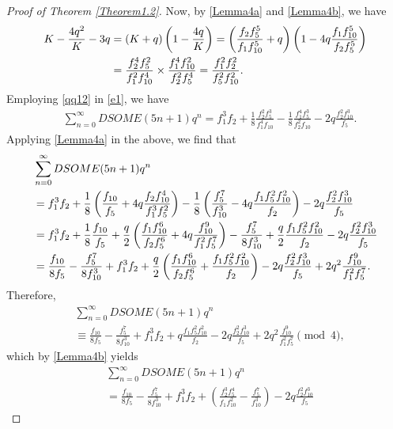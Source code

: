 \documentclass[12pt]{amsart}
\theoremstyle{definition}
\numberwithin{equation}{section}
\begin{document}
\begin{proof}[Proof of Theorem \ref{Theorem1.2}]
Now, by \eqref{Lemma4a} and \eqref{Lemma4b}, we have
    \begin{align}
       \label{qq12} K-\frac{4q^2}{K}-3q&=\left(K+q\right)\left(1-\frac{4q}{K}\right)=\left(\frac{f_{2}f_{5}^{5}}{f_{1}f_{10}^{5}}+q\right)\left(1-4q\frac{f_{1}f_{10}^{5}}{f_{2}f_{5}^{5}}\right)\\
    &=\frac{f_{2}^{4}f_{5}^{2}}{f_{1}^{2}f_{10}^{4}}\times\frac{f_{1}^{4}f_{10}^{2}}{f_{2}^{2}f_{5}^{4}}=\frac{f_{1}^{2}f_{2}^{2}}{f_{5}^{2}f_{10}^{2}}.\notag
    \end{align}
  Employing \eqref{qq12} in \eqref{e1}, we have
    \begin{align}
&\sum_{n=0}^{\infty}DSOME(5n+1)q^n=f_{1}^{3}f_{2}+\frac{1}{8}\frac{f_{2}^{2}f_{5}^{3}}{f_{1}^{4}f_{10}}-\frac{1}{8}\frac{f_{1}^{4}f_{5}^{3}}{f_{2}^{2}f_{10}}-2q\frac{f_{2}^{2}f_{10}^{3}}{f_{5}}.\end{align}
Applying \eqref{Lemma4a} in the above, we find that
\begin{align}\label{c8}&\sum_{n=0}^{\infty}DSOME(5n+1)q^n\\
&=f_{1}^{3}f_{2}+\frac{1}{8}\left(\frac{f_{10}}{f_{5}}+4q\frac{f_{2}f_{10}^{4}}{f_{1}^{3}f_{5}^{2}}\right)-\frac{1}{8}\left(\frac{f_{5}^{7}}{f_{10}^{3}}-4q\frac{f_{1}f_{5}^{2}f_{10}^{2}}{f_{2}}\right)-2q\frac{f_{2}^{2}f_{10}^{3}}{f_{5}}\notag\\
&=f_{1}^{3}f_{2}+\frac{1}{8}\frac{f_{10}}{f_5}+\frac{q}{2}\left(\frac{f_{1}f_{10}^{6}}{f_{2}f_{5}^{6}}+4q\frac{f_{10}^{9}}{f_{1}^{2}f_{5}^{7}}\right)-\frac{f_{5}^{7}}{8f_{10}^{3}}+\dfrac{q}{2}\frac{f_{1}f_{5}^{2}f_{10}^{2}}{f_{2}}-2q\frac{f_{2}^{2}f_{10}^{3}}{f_{5}}\notag\\
&=\frac{f_{10}}{8f_5}-\frac{f_5^7}{8f^3_{10}}+f_1^3f_2
+\dfrac{q}{2}\left(\frac{f_{1}f_{10}^6}{f_2f_5^6}+\frac{f_{1}f_5^2f_{10}^2}{f_2}\right)-2q\frac{f_{2}^{2}f_{10}^{3}}{f_{5}}
+2q^2\frac{f_{10}^{9}}{f_{1}^{2}f_{5}^{7}}.\notag
\end{align}
Therefore, 
\begin{align*}&\sum_{n=0}^{\infty}DSOME(5n+1)q^n\\
&\equiv\frac{f_{10}}{8f_5}-\frac{f_5^7}{8f^3_{10}}+f_1^3f_2
+q\frac{f_{1}f_5^2f_{10}^2}{f_2}-2q\frac{f_{2}^{2}f_{10}^{3}}{f_{5}}
+2q^2\frac{f_{10}^{9}}{f_{1}^{2}f_{5}^{7}}\pmod{4},
\end{align*}
which by \eqref{Lemma4b} yields
\begin{align*}&\sum_{n=0}^{\infty}DSOME(5n+1)q^n\\
&=\frac{f_{10}}{8f_5}-\frac{f_5^7}{8f^3_{10}}+f_1^3f_2
+\left(\frac{f_2^3f_5^4}{f_1f_{10}^2}-\frac{f_5^7}{f_{10}^3}\right)-2q\frac{f_{2}^{2}f_{10}^{3}}{f_{5}}

\end{align*}
\end{proof}
\end{document}
